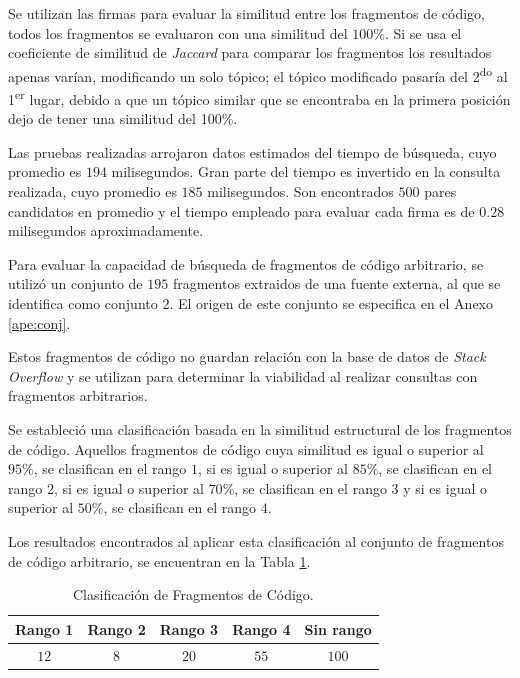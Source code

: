 Se utilizan las firmas para evaluar la similitud entre los fragmentos de código,
todos los fragmentos se evaluaron con una similitud del $100\%$.
Si se usa el coeficiente de similitud de \textit{Jaccard} para comparar los fragmentos los resultados apenas varían,
modificando un solo tópico; el tópico modificado pasaría del 2\textsuperscript{do} al 1\textsuperscript{er} lugar,
debido a que un tópico similar que se encontraba en la primera posición dejo de tener una similitud del 100\%.

Las pruebas realizadas arrojaron datos estimados del tiempo de búsqueda,
cuyo promedio es $194$ milisegundos. Gran parte del tiempo es invertido
en la consulta realizada, cuyo promedio es $185$ milisegundos.
Son encontrados $500$ pares candidatos en promedio y
el tiempo empleado para evaluar cada firma es de $0.28$ milisegundos aproximadamente.




Para evaluar la capacidad de búsqueda de fragmentos de código arbitrario,
se utilizó un conjunto de  $195$ fragmentos extraidos de una fuente externa,
al que se identifica como conjunto $2$. El origen de este conjunto se especifica en el Anexo \ref{ape:conj}.

Estos fragmentos de código no guardan relación con la base de datos de \textit{Stack Overflow} y
se utilizan para determinar la viabilidad al realizar consultas con fragmentos arbitrarios.

Se estableció una clasificación basada en la similitud estructural de los fragmentos de código.
Aquellos fragmentos de código cuya similitud es igual o superior
al $95\%$, se clasifican en el rango $1$, si es igual o superior
al $85\%$, se clasifican en el rango $2$, si es igual o superior
al $70\%$, se clasifican en el rango $3$ y si es igual o superior
al $50\%$, se clasifican en el rango $4$.
 
Los resultados encontrados al aplicar esta clasificación al conjunto de
fragmentos de código arbitrario, se encuentran en la Tabla \ref{tab:clasificacion}.

\begin{table}[h]
\caption{Clasificación de Fragmentos de Código.}
\label{tab:clasificacion}
\centering
\begin{tabular}{ccccc}
\hline
{Rango 1} & {Rango 2} & {Rango 3} & {Rango 4} & {Sin rango} \\
\hline
$12$ & $8$ & $20$ & $55$ & $100$ \\
\hline
\end{tabular}
\end{table}

